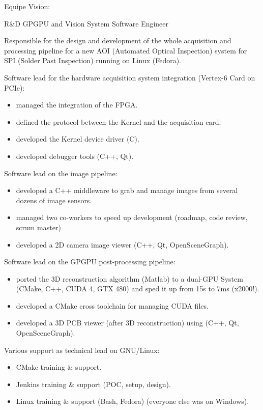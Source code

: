 \documentclass{article}
\begin{document}
\begin{llist}
{Equipe Vision:

}

 {
R\&D GPGPU and Vision System Software Engineer\\
\vspace{-0.33cm}

Responsible for the design and development of the whole acquisition and processing pipeline
for a new AOI (Automated Optical Inspection) system for SPI (Solder Past Inspection)
 running on Linux (Fedora).
\item Software lead for the hardware acquisition system integration (Vertex-6 Card on PCIe):
\begin{itemize}
\item managed the integration of the FPGA.
\item defined the protocol between the Kernel and the acquisition card.
\item developed the Kernel device driver (C).
\item developed debugger tools (C++, Qt).
\end{itemize}
\item Software lead on the image pipeline:
\begin{itemize}
\item developed a C++ middleware to grab and manage images from several dozens of image sensors.
\item managed two co-workers to speed up development (roadmap, code review, scrum master)
\item developed a 2D camera image viewer (C++, Qt, OpenSceneGraph).
\end{itemize}
\item Software lead on the GPGPU post-processing pipeline:
\begin{itemize}
\item ported the 3D reconstruction algorithm (Matlab) to a dual-GPU System (CMake, C++, CUDA 4, GTX 480)
 and sped it up from 15s to 7ms (x2000!).
\item developed a CMake cross toolchain for managing CUDA files.
\item developed a 3D PCB viewer (after 3D reconstruction) using (C++, Qt, OpenSceneGraph).
\end{itemize}

Various support as technical lead on GNU/Linux:
\begin{itemize}
\item CMake training \& support.
\item Jenkins training \& support (POC, setup, design).
\item Linux training \& support (Bash, Fedora) (everyone else was on Windows).
\end{itemize}
} {}


\end{llist}
\end{document}
